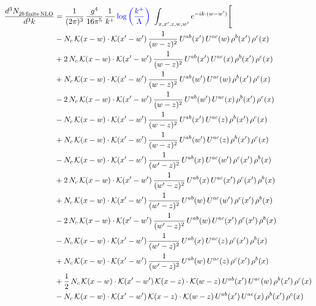 \documentclass[9pt]{article}
\numberwithin{equation}{section}
\begin{document}
\begin{align}
    \frac{d^{3}N_{2b\,\rm finite\, NLO}^{\rm}}{d^{3}k} & = \frac{1}{(2\pi)^{3}}\,\frac{g^{4}}{16\pi^{5}}\,\frac{1}{k^{+}}\,{\color{blue}\log{\left(\frac{k^{+}}{\Lambda}\right)}}\,\,\int_{x,x',z,w,w'}e^{-ik\cdot(w-w')}\Bigg[\notag\\ & -N_{c}\,\mathcal{K}(x-w)\cdot\mathcal{K}(x'-w')\,\frac{1}{(w-z)^{2}}\,U^{ab}(x')\,U^{ac}(w)\,\rho^{b}(x')\,\rho^{c}(x)\notag\\
&+2\,N_{c}\,\mathcal{K}(x-w)\cdot\mathcal{K}(x'-w')\,\frac{1}{(w-z)^{2}}\,U^{ab}(x')\,U^{ac}(x)\,\rho^{b}(x')\,\rho^{c}(x)\notag\\
&+N_{c}\,\mathcal{K}(x-w)\cdot\mathcal{K}(x'-w')\,\frac{1}{(w-z)^{2}}\,U^{ab}(w')\,U^{ac}(w)\,\rho^{b}(x')\,\rho^{c}(x)\notag\\
&-2\,N_{c}\,\mathcal{K}(x-w)\cdot\mathcal{K}(x'-w')\,\frac{1}{(w-z)^{2}}\,U^{ab}(w')\,U^{ac}(x)\,\rho^{b}(x')\,\rho^{c}(x)\notag\\
&-N_{c}\,\mathcal{K}(x-w)\cdot\mathcal{K}(x'-w')\,\frac{1}{(w-z)^{2}}\,U^{ab}(x')\,U^{ac}(z)\,\rho^{b}(x')\,\rho^{c}(x)\notag\\
&+N_{c}\,\mathcal{K}(x-w)\cdot\mathcal{K}(x'-w')\,\frac{1}{(w-z)^{2}}\,U^{ab}(w')\,U^{ac}(z)\,\rho^{b}(x')\,\rho^{c}(x)\notag\\
&-N_{c}\,\mathcal{K}(x-w)\cdot\mathcal{K}(x'-w')\,\frac{1}{(w'-z)^{2}}\,U^{ab}(x)\,U^{ac}(w')\,\rho^{c}(x')\,\rho^{b}(x)\notag\\
&+2\,N_{c}\,\mathcal{K}(x-w)\cdot\mathcal{K}(x'-w')\,\frac{1}{(w'-z)^{2}}\,U^{ab}(x)\,U^{ac}(x')\,\rho^{c}(x')\,\rho^{b}(x)\notag\\
&+N_{c}\,\mathcal{K}(x-w)\cdot\mathcal{K}(x'-w')\,\frac{1}{(w'-z)^{2}}\,U^{ab}(w)\,U^{ac}(w')\,\rho^{c}(x')\,\rho^{b}(x)\notag\\
&-2\,N_{c}\,\mathcal{K}(x-w)\cdot\mathcal{K}(x'-w')\,\frac{1}{(w'-z)^{2}}\,U^{ab}(w)\,U^{ac}(x')\,\rho^{c}(x')\,\rho^{b}(x)\notag\\
&-N_{c}\,\mathcal{K}(x-w)\cdot\mathcal{K}(x'-w')\,\frac{1}{(w'-z)^{2}}\,U^{ab}(x)\,U^{ac}(z)\,\rho^{c}(x')\,\rho^{b}(x)\notag\\
&+N_{c}\,\mathcal{K}(x-w)\cdot\mathcal{K}(x'-w')\,\frac{1}{(w'-z)^{2}}\,U^{ab}(w)\,U^{ac}(z)\,\rho^{c}(x')\,\rho^{b}(x)\notag\\
&+\frac{1}{2}\,N_{c}\,\mathcal{K}(x-w)\cdot\mathcal{K}(x'-w')\,\mathcal{K}(x-z)\cdot\mathcal{K}(w-z)\,U^{ab}(x')\,U^{ac}(w)\,\rho^{b}(x')\,\rho^{c}(x)\notag\\
&-N_{c}\,\mathcal{K}(x-w)\cdot\mathcal{K}(x'-w')\,\mathcal{K}(x-z)\cdot\mathcal{K}(w-z)\,U^{ab}(x')\,U^{ac}(x)\,\rho^{b}(x')\,\rho^{c}(x)\notag\\

\end{align}
\end{document}
